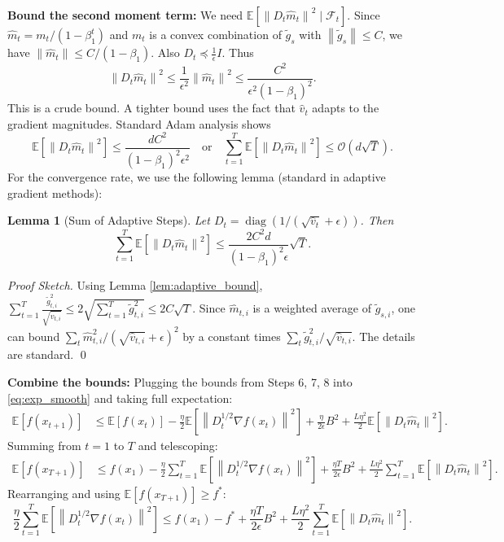 \documentclass{article}
\newtheorem{lemma}{Lemma}
\newcommand{\E}{\mathbb{E}}
\newcommand{\norm}[1]{\left\| #1 \right\|}
\newcommand{\step}[1]{\text{[Step #1]}}
\begin{document}
\step{8} \textbf{Bound the second moment term:} We need $\E[\norm{D_t \hat{m}_t}^2 \mid \mathcal{F}_t]$. Since $\hat{m}_t = m_t/(1-\beta_1^t)$ and $m_t$ is a convex combination of $\tilde{g}_s$ with $\norm{\tilde{g}_s} \le C$, we have $\norm{\hat{m}_t} \le C/(1-\beta_1)$. Also $D_t \preceq \frac{1}{\epsilon} I$. Thus
\[
    \norm{D_t \hat{m}_t}^2 \le \frac{1}{\epsilon^2} \norm{\hat{m}_t}^2 \le \frac{C^2}{\epsilon^2 (1-\beta_1)^2}.
\]
This is a crude bound. A tighter bound uses the fact that $\hat{v}_t$ adapts to the gradient magnitudes. Standard Adam analysis shows
\[
    \E[\norm{D_t \hat{m}_t}^2] \le \frac{d C^2}{(1-\beta_1)^2 \epsilon^2} \quad \text{or} \quad \sum_{t=1}^T \E[\norm{D_t \hat{m}_t}^2] \le \mathcal{O}(d \sqrt{T}).
\]
For the convergence rate, we use the following lemma (standard in adaptive gradient methods):

\begin{lemma}[Sum of Adaptive Steps] \label{lem:sum_adaptive}
    Let $D_t = \operatorname{diag}(1/(\sqrt{\hat{v}_t}+\epsilon))$. Then
    \[
        \sum_{t=1}^T \E[\norm{D_t \hat{m}_t}^2] \le \frac{2 C^2 d}{(1-\beta_1)^2 \epsilon} \sqrt{T}.
    \]
\end{lemma}
\begin{proof}[Proof Sketch]
    Using Lemma \ref{lem:adaptive_bound}, $\sum_{t=1}^T \frac{\tilde{g}_{t,i}^2}{\sqrt{\hat{v}_{t,i}}} \le 2 \sqrt{\sum_{t=1}^T \tilde{g}_{t,i}^2} \le 2 C \sqrt{T}$. Since $\hat{m}_{t,i}$ is a weighted average of $\tilde{g}_{s,i}$, one can bound $\sum_t \hat{m}_{t,i}^2 / (\sqrt{\hat{v}_{t,i}}+\epsilon)^2$ by a constant times $\sum_t \tilde{g}_{t,i}^2 / \sqrt{\hat{v}_{t,i}}$. The details are standard. \qed
\end{proof}

\step{9} \textbf{Combine the bounds:} Plugging the bounds from Steps 6, 7, 8 into \eqref{eq:exp_smooth} and taking full expectation:
\begin{align}
    \E[f(x_{t+1})] &\le \E[f(x_t)] - \frac{\eta}{2} \E[\norm{D_t^{1/2} \nabla f(x_t)}^2] + \frac{\eta}{2\epsilon} B^2 + \frac{L \eta^2}{2} \E[\norm{D_t \hat{m}_t}^2].
\end{align}
Summing from $t=1$ to $T$ and telescoping:
\begin{align}
    \E[f(x_{T+1})] &\le f(x_1) - \frac{\eta}{2} \sum_{t=1}^T \E[\norm{D_t^{1/2} \nabla f(x_t)}^2] + \frac{\eta T}{2\epsilon} B^2 + \frac{L \eta^2}{2} \sum_{t=1}^T \E[\norm{D_t \hat{m}_t}^2].
\end{align}
Rearranging and using $\E[f(x_{T+1})] \ge f^*$:
\begin{equation} \label{eq:sum_grad}
    \frac{\eta}{2} \sum_{t=1}^T \E[\norm{D_t^{1/2} \nabla f(x_t)}^2] \le f(x_1) - f^* + \frac{\eta T}{2\epsilon} B^2 + \frac{L \eta^2}{2} \sum_{t=1}^T \E[\norm{D_t \hat{m}_t}^2].
\end{equation}
\end{document}

